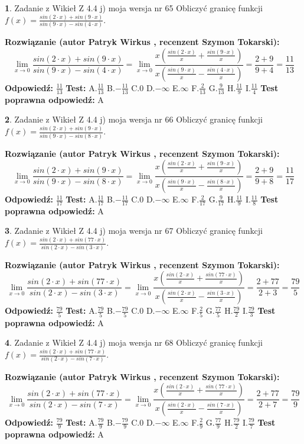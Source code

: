 \documentclass[12pt, a4paper]{article}
\theoremstyle{definition} %
\newtheorem{zad}{}
\newcommand{\zadStart}[1]{\begin{zad}#1\newline}
\newcommand{\zadStop}{\end{zad}}
\newcommand{\rozwStart}[2]{\noindent \textbf{Rozwiązanie (autor #1 , recenzent #2): }\newline}
\newcommand{\rozwStop}{\newline}
\newcommand{\odpStart}{\noindent \textbf{Odpowiedź:}\newline}
\newcommand{\odpStop}{\newline}
\newcommand{\testStart}{\noindent \textbf{Test:}\newline}
\newcommand{\testStop}{\newline}
\newcommand{\kluczStart}{\noindent \textbf{Test poprawna odpowiedź:}\newline}
\newcommand{\kluczStop}{\newline}
\begin{document}
\zadStart{Zadanie z Wikieł Z 4.4 j) moja wersja nr 65}
Obliczyć granicę funkcji $f(x)=\frac{sin(2\cdot x) +sin(9\cdot x)}{sin(9\cdot x) -sin(4\cdot x)}$.
\zadStop
\rozwStart{Patryk Wirkus}{Szymon Tokarski}
$$\lim\limits_{x\to 0}\frac{sin(2\cdot x) +sin(9\cdot x)}{sin(9\cdot x) -sin(4\cdot x)}=\lim\limits_{x\to 0}\frac{x(\frac{sin(2\cdot x)}{x}+\frac{sin(9\cdot x)}{x})}{x(\frac{sin(9\cdot x)}{x}-\frac{sin(4\cdot x)}{x})}=\frac{2+9}{9+4} = \frac{11}{13}$$
\rozwStop
\odpStart
$\frac{11}{13}$
\odpStop
\testStart
A.$\frac{11}{13}$
B.$-\frac{11}{13}$
C.$0$
D.$-\infty$
E.$\infty$
F.$\frac{2}{13}$
G.$\frac{9}{13}$
H.$\frac{11}{9}$
I.$\frac{11}{4}$
\testStop
\kluczStart
A
\kluczStop



\zadStart{Zadanie z Wikieł Z 4.4 j) moja wersja nr 66}
Obliczyć granicę funkcji $f(x)=\frac{sin(2\cdot x) +sin(9\cdot x)}{sin(9\cdot x) -sin(8\cdot x)}$.
\zadStop
\rozwStart{Patryk Wirkus}{Szymon Tokarski}
$$\lim\limits_{x\to 0}\frac{sin(2\cdot x) +sin(9\cdot x)}{sin(9\cdot x) -sin(8\cdot x)}=\lim\limits_{x\to 0}\frac{x(\frac{sin(2\cdot x)}{x}+\frac{sin(9\cdot x)}{x})}{x(\frac{sin(9\cdot x)}{x}-\frac{sin(8\cdot x)}{x})}=\frac{2+9}{9+8} = \frac{11}{17}$$
\rozwStop
\odpStart
$\frac{11}{17}$
\odpStop
\testStart
A.$\frac{11}{17}$
B.$-\frac{11}{17}$
C.$0$
D.$-\infty$
E.$\infty$
F.$\frac{2}{17}$
G.$\frac{9}{17}$
H.$\frac{11}{9}$
I.$\frac{11}{8}$
\testStop
\kluczStart
A
\kluczStop



\zadStart{Zadanie z Wikieł Z 4.4 j) moja wersja nr 67}
Obliczyć granicę funkcji $f(x)=\frac{sin(2\cdot x) +sin(77\cdot x)}{sin(2\cdot x) -sin(3\cdot x)}$.
\zadStop
\rozwStart{Patryk Wirkus}{Szymon Tokarski}
$$\lim\limits_{x\to 0}\frac{sin(2\cdot x) +sin(77\cdot x)}{sin(2\cdot x) -sin(3\cdot x)}=\lim\limits_{x\to 0}\frac{x(\frac{sin(2\cdot x)}{x}+\frac{sin(77\cdot x)}{x})}{x(\frac{sin(2\cdot x)}{x}-\frac{sin(3\cdot x)}{x})}=\frac{2+77}{2+3} = \frac{79}{5}$$
\rozwStop
\odpStart
$\frac{79}{5}$
\odpStop
\testStart
A.$\frac{79}{5}$
B.$-\frac{79}{5}$
C.$0$
D.$-\infty$
E.$\infty$
F.$\frac{2}{5}$
G.$\frac{77}{5}$
H.$\frac{79}{2}$
I.$\frac{79}{3}$
\testStop
\kluczStart
A
\kluczStop



\zadStart{Zadanie z Wikieł Z 4.4 j) moja wersja nr 68}
Obliczyć granicę funkcji $f(x)=\frac{sin(2\cdot x) +sin(77\cdot x)}{sin(2\cdot x) -sin(7\cdot x)}$.
\zadStop
\rozwStart{Patryk Wirkus}{Szymon Tokarski}
$$\lim\limits_{x\to 0}\frac{sin(2\cdot x) +sin(77\cdot x)}{sin(2\cdot x) -sin(7\cdot x)}=\lim\limits_{x\to 0}\frac{x(\frac{sin(2\cdot x)}{x}+\frac{sin(77\cdot x)}{x})}{x(\frac{sin(2\cdot x)}{x}-\frac{sin(7\cdot x)}{x})}=\frac{2+77}{2+7} = \frac{79}{9}$$
\rozwStop
\odpStart
$\frac{79}{9}$
\odpStop
\testStart
A.$\frac{79}{9}$
B.$-\frac{79}{9}$
C.$0$
D.$-\infty$
E.$\infty$
F.$\frac{2}{9}$
G.$\frac{77}{9}$
H.$\frac{79}{2}$
I.$\frac{79}{7}$
\testStop
\kluczStart
A
\kluczStop
\end{document}

